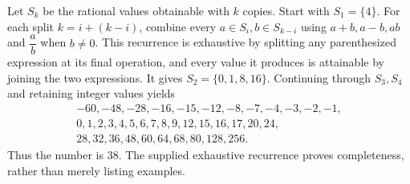Let $S_k$ be the rational values obtainable with $k$ copies. Start with $S_1=\{4\}$. For each split $k=i+(k-i)$, combine every $a\in S_i,b\in S_{k-i}$ using $a+b,a-b,ab$ and $\dfrac{a}{b}$ when $b\ne0$. This recurrence is exhaustive by splitting any parenthesized expression at its final operation, and every value it produces is attainable by joining the two expressions.
It gives $S_2=\{0,1,8,16\}$. Continuing through $S_3,S_4$ and retaining integer values yields
\[\begin{gathered}-60,-48,-28,-16,-15,-12,-8,-7,-4,-3,-2,-1,\\0,1,2,3,4,5,6,7,8,9,12,15,16,17,20,24,\\28,32,36,48,60,64,68,80,128,256.\end{gathered}\]
Thus the number is $\boxed{38}$. The supplied exhaustive recurrence proves completeness, rather than merely listing examples.
